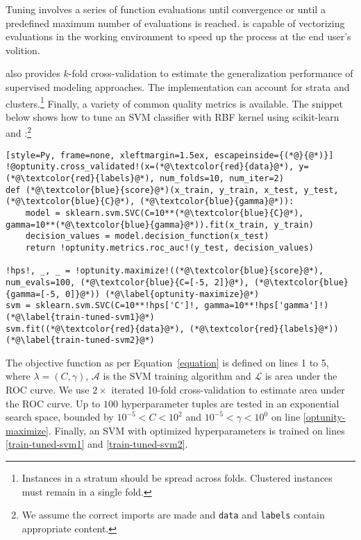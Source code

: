 Tuning involves a series of function evaluations until convergence or until a predefined maximum number of evaluations is reached. \optunity is capable of vectorizing evaluations in the working environment to speed up the process at the end user's volition.

\optunity also provides $k$-fold cross-validation to estimate the generalization performance of supervised modeling approaches. The implementation can account for strata and clusters.\footnote{Instances in a stratum should be spread across folds. Clustered instances must remain in a single fold.} Finally, a variety of common quality metrics is available. 
The snippet below shows how to tune an SVM classifier with RBF kernel using {\sc scikit-learn} and \optunity:\footnote{We assume the correct imports are made and \texttt{data} and \texttt{labels} contain appropriate content.}


\begin{lstlisting}[style=Py, frame=none, xleftmargin=1.5ex, escapeinside={(*@}{@*)}]
!@optunity.cross_validated!(x=(*@\textcolor{red}{data}@*), y=(*@\textcolor{red}{labels}@*), num_folds=10, num_iter=2)
def (*@\textcolor{blue}{score}@*)(x_train, y_train, x_test, y_test, (*@\textcolor{blue}{C}@*), (*@\textcolor{blue}{gamma}@*)):
    model = sklearn.svm.SVC(C=10**(*@\textcolor{blue}{C}@*), gamma=10**(*@\textcolor{blue}{gamma}@*)).fit(x_train, y_train)
    decision_values = model.decision_function(x_test)
    return !optunity.metrics.roc_auc!(y_test, decision_values)

!hps!, _, _ = !optunity.maximize!((*@\textcolor{blue}{score}@*), num_evals=100, (*@\textcolor{blue}{C=[-5, 2]}@*), (*@\textcolor{blue}{gamma=[-5, 0]}@*)) (*@\label{optunity-maximize}@*)
svm = sklearn.svm.SVC(C=10**!hps['C']!, gamma=10**!hps['gamma']!) (*@\label{train-tuned-svm1}@*)
svm.fit((*@\textcolor{red}{data}@*), (*@\textcolor{red}{labels}@*)) (*@\label{train-tuned-svm2}@*)
\end{lstlisting}

The objective function as per Equation~\eqref{equation} is defined on lines 1 to 5, where $\lambda = (C, \gamma)$, $\mathcal{A}$ is the SVM training algorithm and $\mathcal{L}$ is area under the ROC curve. We use $2\times$ iterated 10-fold cross-validation to estimate area under the ROC curve. Up to $100$ hyperparameter tuples are tested in an exponential search space, bounded by $10^{-5} < C < 10^2$ and $10^{-5} < \gamma < 10^0$ on line \ref{optunity-maximize}. Finally, an SVM with optimized hyperparameters is trained on lines \ref{train-tuned-svm1} and \ref{train-tuned-svm2}.


